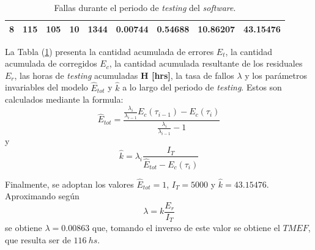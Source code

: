 \begin{table}[H]
\begin{tabular}{|c|c|c|c|c|c|c|c|c|}
8                & 115                        & 105                           & 10                            & 1344             & 0.00744                  & 0.54688                                        & 10.86207                       & 43.15476                \\ \hline
\end{tabular}
\caption{Fallas durante el periodo de \textit{testing} del \textit{software}.}
\label{tab:confsoft}
\end{table}

La Tabla (\ref{tab:confsoft}) presenta la cantidad acumulada de errores $E_t$, la cantidad acumulada de corregidos $E_c$, la cantidad acumulada resultante de los residuales $E_r$, las horas de \textit{testing} acumuladas \textbf{H [hrs]}, la tasa de fallos $\lambda$ y los parámetros invariables del modelo $\hat{E}_{tot}$ y $\hat{k}$ a lo largo del periodo de \textit{testing}. Estos son calculados mediante la formula:
\begin{equation}
	\hat{E}_{tot} = \frac{ \frac{\lambda_i}{\lambda_{i-1}} E_c(\tau_{i-1})-E_c(\tau_i)}{\frac{\lambda_i}{\lambda_{i-1}}-1}
\end{equation}
y
\begin{equation}
	\hat{k} = \lambda_i\frac{I_T}{\hat{E}_{tot}-E_c(\tau_i)}
\end{equation}

Finalmente, se adoptan los valores $\hat{E}_{tot} = 1$, $I_T = 5000$  y $\hat{k} = 43.15476$. Aproximando según
\begin{equation}
	\lambda = k\frac{E_r}{I_T}
\end{equation}
se obtiene $\lambda = 0.00863$ que, tomando el inverso de este valor se obtiene el $TMEF$, que resulta ser de $ 116 \ hs$.

%
